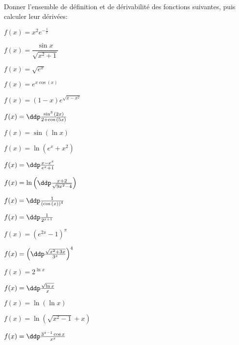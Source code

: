 
\begin{exercice}  \; Donner l'ensemble de d\'efinition et de d\'erivabilit\'e des fonctions suivantes, puis calculer leur d\'eriv\'ees:
\begin{enumerate}
\begin{minipage}[t]{0.27\textwidth}
\item $f(x)=x^2e^{-\frac{1}{x}}$
\item $f(x)=\dfrac{\sin x}{\sqrt{x^2+1}}$
\item $f(x)=\sqrt{e^x}$
\item $f(x)=e^{x\cos{(x)}}$
\item $f(x)=(1-x)e^{\sqrt{x-x^2}}$\item $f(x)=\ddp\frac{\sin^3{(2x)}}{2+\cos{(5x)}}$
\item $f(x)=\sin{(\ln{x})}$
\end{minipage}
\begin{minipage}[t]{0.3\textwidth}
\item $f(x) =\ln(e^x+x^2)$
\item $f(x)=\ddp\frac{x-e^x}{e^x+1}$
\item $f(x)=\ln{\left(  \ddp\frac{x+2}{\sqrt{9x^2-4}} \right)}$
\item $f(x)=\ddp\frac{1}{(\cos{(x)})^4}$
\item $f(x)=\ddp\frac{1}{2^{x+1}}$
\item $f(x)=(e^{2x}-1)^{\pi}$
\end{minipage}
\begin{minipage}[t]{0.3\textwidth}
\item $f(x)=\left(  \ddp\frac{\sqrt{x^2+3x}}{3^x} \right)^4$
\item $f(x)=2^{\ln{x}}$
\item $f(x)=\ddp\frac{\sqrt{\ln{x}}}{x}$
\item $f(x)=\ln{(\ln{x})}$
\item $f(x)=\ln{(\sqrt{x^2-1}+x)}$
\item $f(x)=\ddp\frac{3^{x-1}\cos{x}}{x^x}$
\end{minipage}
\end{enumerate}
\end{exercice}